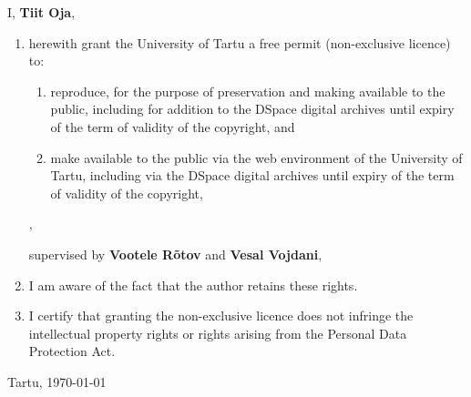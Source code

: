 \documentclass{style/thesis}
\begin{document}
\renewcommand{\labelenumii}{\theenumii}
\renewcommand{\theenumii}{\theenumi.\arabic{enumii}.}

I, \textbf{Tiit Oja},

\begin{enumerate}
	\item herewith grant the University of Tartu a free permit (non-exclusive licence) to:

	\begin{enumerate}[label*=\arabic*.]
		\item reproduce, for the purpose of preservation and making available to the public, including for addition to the DSpace digital archives until expiry of the term of validity of the copyright, and

		\item make available to the public via the web environment of the University of Tartu, including via the DSpace digital archives until expiry of the term of validity of the copyright,
	\end{enumerate}

	\textbf{\articleName},

	supervised by \textbf{Vootele Rõtov} and \textbf{Vesal Vojdani},

	\item I am aware of the fact that the author retains these rights.
	\item I certify that granting the non-exclusive licence does not infringe the intellectual property rights or rights arising from the Personal Data Protection Act.
\end{enumerate}

\noindent
Tartu, \dotdate\today
\end{document}
